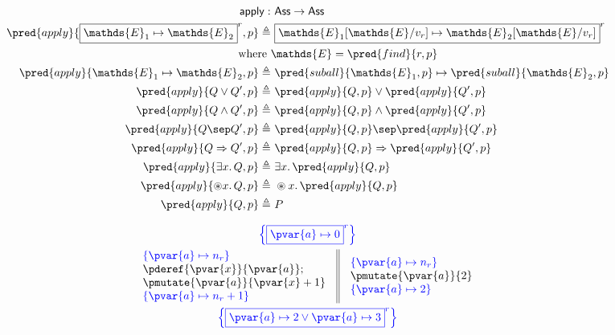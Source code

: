\begin{align*}
\mathsf{apply} :&\ \mathsf{Ass} \rightarrow \mathsf{Ass} \\
\pred{apply}{\boxed{\mathds{E}_1 \mapsto \mathds{E}_2}^r, p} \triangleq&\ \boxed{\mathds{E}_1[\mathds{E}/v_r] \mapsto \mathds{E}_2[\mathds{E}/v_r]}^r \\
\text{where }& \mathds{E} = \pred{find}{r, p} \\
\pred{apply}{\mathds{E}_1 \mapsto \mathds{E}_2, p} \triangleq&\ \pred{suball}{\mathds{E}_1, p} \mapsto \pred{suball}{\mathds{E}_2, p} \\
\pred{apply}{Q \lor Q', p} \triangleq&\ \pred{apply}{Q, p} \lor \pred{apply}{Q', p} \\
\pred{apply}{Q \land Q', p} \triangleq&\ \pred{apply}{Q, p} \land \pred{apply}{Q', p} \\
\pred{apply}{Q \sep Q', p} \triangleq&\ \pred{apply}{Q, p} \sep \pred{apply}{Q', p} \\
\pred{apply}{Q \Rightarrow Q', p} \triangleq&\ \pred{apply}{Q, p} \Rightarrow \pred{apply}{Q', p} \\
\pred{apply}{\exists x \ldotp Q, p} \triangleq&\ \exists x \ldotp \pred{apply}{Q, p} \\
\pred{apply}{\circledast x \ldotp Q, p} \triangleq&\ \circledast x \ldotp \pred{apply}{Q, p} \\
\pred{apply}{Q, p} \triangleq&\ P
\end{align*}

\iffalse
\begin{gather*}
\color{blue} \left\lbrace \boxed{\pvar{a} \mapsto 0}^r \right\rbrace \\
\begin{array}{c || c}
\begin{array}{l}
\color{blue} \left\lbrace \pvar{a} \mapsto n_r \right\rbrace \\
\pderef{\pvar{x}}{\pvar{a}}; \\
\pmutate{\pvar{a}}{\pvar{x} + 1} \\
\color{blue} \left\lbrace \pvar{a} \mapsto n_r + 1 \right\rbrace
\end{array}
&
\begin{array}{l}
\color{blue} \left\lbrace \pvar{a} \mapsto n_r \right\rbrace \\
\pmutate{\pvar{a}}{2} \\
\color{blue} \left\lbrace \pvar{a} \mapsto 2 \right\rbrace
\end{array}
\end{array} \\
\color{blue} \left\lbrace \boxed{\pvar{a} \mapsto 2 \lor \pvar{a} \mapsto 3}^r \right\rbrace
\end{gather*}

